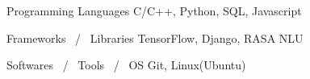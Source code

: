 

\begin{cvskills}

  \cvskill
    {Programming Languages} %
    {C/C++, Python, SQL, Javascript} %


  \cvskill
    {Frameworks \, / \, Libraries} %
    {TensorFlow, Django, RASA NLU} %

\cvskill
    {Softwares \, / \, Tools \, / \, OS} %
    {Git, Linux(Ubuntu)} %

\end{cvskills}

